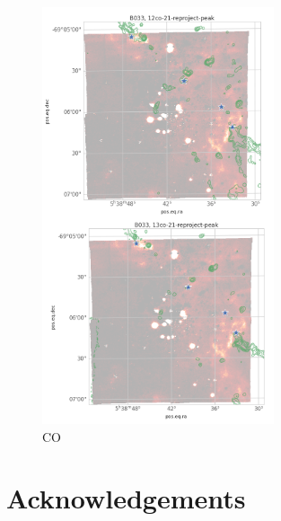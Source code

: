 \documentclass[useAMS, usenatbib, a4paper]{mnras}
\begin{document}
\begin{figure}
\centering
\includegraphics[width=\columnwidth]{Figures/CO.png}
\caption{CO}
\label{fig:CO}
\end{figure}









\newpage

\section*{Acknowledgements}






\bsp	%
\label{lastpage}
\end{document}
